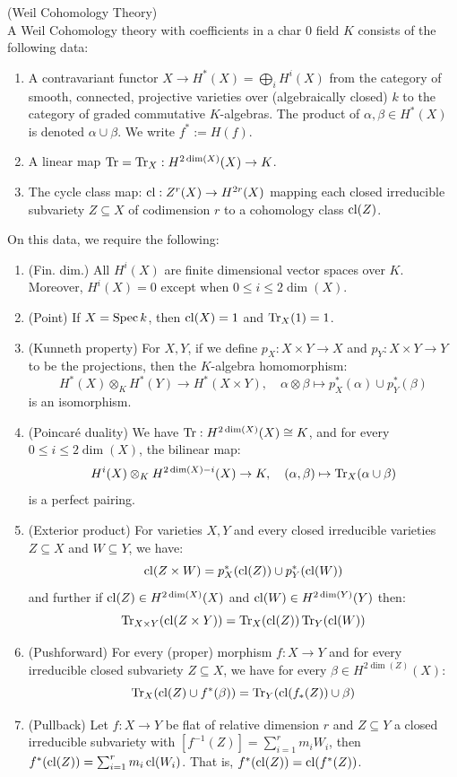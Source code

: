 \documentclass[12pt]{amsart}
\begin{document}
\begin{definition}(Weil Cohomology Theory) \\
    A Weil Cohomology theory with coefficients in a char $0$ field $K$ consists of the following data:
    \begin{enumerate}
        \item A contravariant functor $X \to H^*(X) = \bigoplus_i H^i(X)$ from the category of smooth, connected, projective varieties over (algebraically closed) $k$ to the category of graded commutative $K$-algebras. The product of $\alpha, \beta \in H^*(X)$ is denoted $\alpha \cup \beta$. We write $f^* := H(f)$. 
        \item A linear map $\operatorname{Tr} = \operatorname{Tr}_X: H^{2\dim(X)}(X) \to K$.
        \item The cycle class map: $\operatorname{cl}: Z^r(X) \to H^{2r}(X)$ mapping each closed irreducible subvariety $Z \subseteq X$ of codimension $r$ to a cohomology class $\operatorname{cl}(Z)$.
    \end{enumerate}
    On this data, we require the following: 
    \begin{enumerate}
        \item (Fin. dim.) All $H^i(X)$ are finite dimensional vector spaces over $K$. Moreover, $H^i(X) = 0$ except when $0 \leq i \leq 2 \dim(X)$.
        \item (Point) If $X = \operatorname{Spec} k$, then $\operatorname{cl}(X) = 1$ and $\operatorname{Tr}_X(1) = 1$. 
        \item (Kunneth property) For $X, Y$, if we define $p_X:X \times Y \to X$ and $p_Y: X \times Y \to Y$ to be the projections, then the $K$-algebra homomorphism: 
        \[ H^*(X) \otimes_K H^*(Y) \to H^*(X \times Y), \quad \alpha \otimes \beta \mapsto p_X^*(\alpha) \cup p_Y^*(\beta) \] 
        is an isomorphism. 
        \item (Poincaré duality) We have $\operatorname{Tr}: H^{2\dim(X)}(X) \cong K$, and for every $0 \leq i \leq 2 \dim(X)$, the bilinear map: 
        \[ 
            H^i(X) \otimes_K H^{2 \dim(X) -i}(X) \to K, \quad (\alpha, \beta) \mapsto \operatorname{Tr}_X(\alpha \cup \beta)
        \]
        is a perfect pairing.
        \item (Exterior product) For varieties $X, Y$ and every closed irreducible varieties $Z \subseteq X$ and $W \subseteq Y$, we have:
        \[
            \operatorname{cl}(Z \times W) = p^*_X(\operatorname{cl}(Z)) \cup p^*_Y(\operatorname{cl}(W))
        \]
        and further if $\operatorname{cl}(Z) \in H^{2\dim(X)}(X)$ and $\operatorname{cl}(W) \in H^{2\dim(Y)}(Y)$ then: 
        \[  \operatorname{Tr}_{X\times Y}(\operatorname{cl}(Z \times Y)) = \operatorname{Tr}_X(\operatorname{cl}(Z))\operatorname{Tr}_Y(\operatorname{cl}(W)) \] 
        \item (Pushforward) For every (proper) morphism $f: X \to Y$ and for every irreducible closed subvariety $Z \subseteq X$, we have for every $\beta \in H^{2 \dim(Z)}(X)$:
        \[ 
            \operatorname{Tr}_X(\operatorname{cl}(Z) \cup f^*(\beta)) = \operatorname{Tr}_Y(\operatorname{cl}(f_*(Z)) \cup \beta)
        \]
        \item (Pullback) Let $f: X \to Y$ be flat of relative dimension $r$ and $Z \subseteq Y$ a closed irreducible subvariety with $[f^{-1}(Z)] = \sum_{i=1}^r m_iW_i$, then $f^*(\operatorname{cl}(Z)) = \sum_{i=1}^r m_i\operatorname{cl}(W_i)$. That is, $f^*(\operatorname{cl}(Z)) = \operatorname{cl}(f^*(Z))$. 
    \end{enumerate}
\end{definition}
\end{document}
